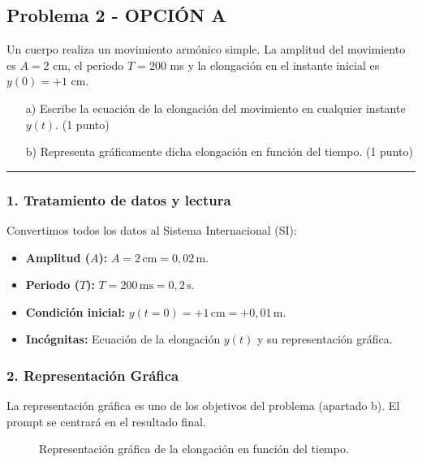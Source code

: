 \subsection{Problema 2 - OPCIÓN A}
\label{subsec:2A_2010_jun_ord}
\begin{cajaenunciado}
Un cuerpo realiza un movimiento armónico simple. La amplitud del movimiento es $A=2$ cm, el periodo $T=200$ ms y la elongación en el instante inicial es $y(0)=+1$ cm.
\begin{enumerate}
    \item[a)] Escribe la ecuación de la elongación del movimiento en cualquier instante $y(t)$. (1 punto)
    \item[b)] Representa gráficamente dicha elongación en función del tiempo. (1 punto)
\end{enumerate}
\end{cajaenunciado}
\hrule

\subsubsection*{1. Tratamiento de datos y lectura}
Convertimos todos los datos al Sistema Internacional (SI):
\begin{itemize}
    \item \textbf{Amplitud ($A$):} $A = 2\,\text{cm} = 0,02\,\text{m}$.
    \item \textbf{Periodo ($T$):} $T = 200\,\text{ms} = 0,2\,\text{s}$.
    \item \textbf{Condición inicial:} $y(t=0) = +1\,\text{cm} = +0,01\,\text{m}$.
    \item \textbf{Incógnitas:} Ecuación de la elongación $y(t)$ y su representación gráfica.
\end{itemize}

\subsubsection*{2. Representación Gráfica}
La representación gráfica es uno de los objetivos del problema (apartado b). El prompt se centrará en el resultado final.
\begin{figure}[H]
    \centering
    \caption{Representación gráfica de la elongación en función del tiempo.}
\end{figure}

